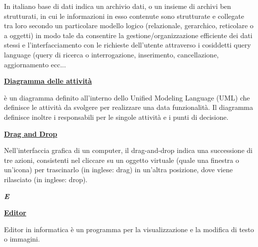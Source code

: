 \medskip
\begin{addmargin}[5em]{1em}	
In italiano base di dati indica un archivio dati, o un insieme di archivi ben strutturati, in cui le informazioni in esso contenute sono strutturate e collegate tra loro secondo un particolare modello logico (relazionale, gerarchico, reticolare o a oggetti) in modo tale da consentire la gestione/organizzazione efficiente dei dati stessi e l'interfacciamento con le richieste dell'utente attraverso i cosiddetti query language (query di ricerca o interrogazione, inserimento, cancellazione, aggiornamento ecc...
\end{addmargin}	

\bigskip
\begin{addmargin}[0em]{0em}	
	\textbf{\underline{Diagramma delle attività}}
\end{addmargin}
	
\medskip
\begin{addmargin}[5em]{1em}	
è un diagramma definito all'interno dello Unified Modeling Language (UML) che definisce le attività da svolgere per realizzare una data funzionalità. Il diagramma definisce inoltre i responsabili per le singole attività e i punti di decisione. 
\end{addmargin}	

\bigskip
\begin{addmargin}[0em]{0em}	
	\textbf{\underline{Drag and Drop}}
\end{addmargin}
	
\medskip
\begin{addmargin}[5em]{1em}	
Nell'interfaccia grafica di un computer, il drag-and-drop indica una successione di tre azioni, consistenti nel cliccare su un oggetto virtuale (quale una finestra o un'icona) per trascinarlo (in inglese: drag) in un'altra posizione, dove viene rilasciato (in inglese: drop).
\end{addmargin}	
	
\newpage

\cleardoublepage
{}
{}
\noindent\hrulefill\hspace{4mm}\textbf{\textsl{\Huge{E}}}\hspace{4mm}\hrulefill
\vspace*{2\bigskipamount}

\begin{addmargin}[0em]{0em}
	\textbf{\underline{Editor}} 
\end{addmargin}
	
\medskip
\begin{addmargin}[5em]{1em}	
Editor in informatica è un programma per la visualizzazione e la modifica di testo o immagini.
\end{addmargin}


